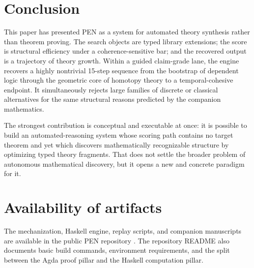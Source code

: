 \documentclass[pdflatex,sn-mathphys,Numbered]{sn-jnl}
\theoremstyle{thmstyleone}
\theoremstyle{thmstylethree}
\theoremstyle{thmstyletwo}
\begin{document}
\section{Conclusion}\label{sec:conclusion}

This paper has presented PEN as a system for automated theory synthesis rather than theorem proving. The search objects are typed library extensions; the score is structural efficiency under a coherence-sensitive bar; and the recovered output is a trajectory of theory growth. Within a guided claim-grade lane, the engine recovers a highly nontrivial 15-step sequence from the bootstrap of dependent logic through the geometric core of homotopy theory to a temporal-cohesive endpoint. It simultaneously rejects large families of discrete or classical alternatives for the same structural reasons predicted by the companion mathematics.

The strongest contribution is conceptual and executable at once: it is possible to build an automated-reasoning system whose scoring path contains no target theorem and yet which discovers mathematically recognizable structure by optimizing typed theory fragments. That does not settle the broader problem of autonomous mathematical discovery, but it opens a new and concrete paradigm for it.

\clearpage

\section*{Availability of artifacts}

The mechanization, Haskell engine, replay scripts, and companion manuscripts are available in the public PEN repository \cite{pen-artifact}. The repository README also documents basic build commands, environment requirements, and the split between the Agda proof pillar and the Haskell computation pillar.


\end{document}

